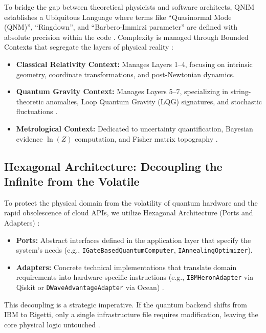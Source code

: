 \documentclass[11pt,a4paper,spanish]{book}
\numberwithin{equation}{chapter}
\numberwithin{figure}{chapter}
\numberwithin{equation}{chapter}
\numberwithin{figure}{chapter}
\numberwithin{table}{chapter}
\begin{document}
To bridge the gap between theoretical physicists and software architects, QNIM establishes a Ubiquitous Language where terms like ``Quasinormal Mode (QNM)'', ``Ringdown'', and ``Barbero-Immirzi parameter'' are defined with absolute precision within the code \cite{wojciechowski_ddd}. Complexity is managed through Bounded Contexts that segregate the layers of physical reality \cite{medium_clean_ddd}:

\begin{itemize}
    \item \textbf{Classical Relativity Context:} Manages Layers 1--4, focusing on intrinsic geometry, coordinate transformations, and post-Newtonian dynamics.
    \item \textbf{Quantum Gravity Context:} Manages Layers 5--7, specializing in string-theoretic anomalies, Loop Quantum Gravity (LQG) signatures, and stochastic fluctuations \cite{echoes_area_quantization}.
    \item \textbf{Metrological Context:} Dedicated to uncertainty quantification, Bayesian evidence $\ln(Z)$ computation, and Fisher matrix topography \cite{semanticscholar_fisher}.
\end{itemize}

\subsection{Hexagonal Architecture: Decoupling the Infinite from the Volatile}

To protect the physical domain from the volatility of quantum hardware and the rapid obsolescence of cloud APIs, we utilize Hexagonal Architecture (Ports and Adapters) \cite{raw_githubusercontent_clean_architecture, geeksforgeeks_clean}:
\begin{itemize}
    \item \textbf{Ports:} Abstract interfaces defined in the application layer that specify the system's needs (e.g., \texttt{IGateBasedQuantumComputer}, \texttt{IAnnealingOptimizer}).
    \item \textbf{Adapters:} Concrete technical implementations that translate domain requirements into hardware-specific instructions (e.g., \texttt{IBMHeronAdapter} via Qiskit or \texttt{DWaveAdvantageAdapter} via Ocean) \cite{dwave_dual_platform}.
\end{itemize}
This decoupling is a strategic imperative. If the quantum backend shifts from IBM to Rigetti, only a single infrastructure file requires modification, leaving the core physical logic untouched \cite{quantum_machines_blueprint}.
\end{document}
